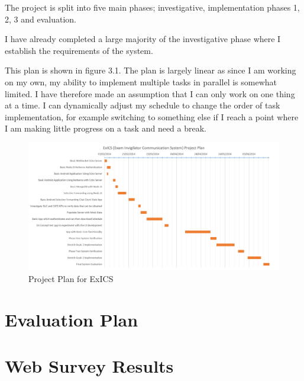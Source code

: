 \documentclass[a4paper, 12pt, notitlepage]{report}
\begin{document}
The project is split into five main phases; investigative, implementation phases 1, 2, 3 and evaluation.

I have already completed a large majority of the investigative phase where I establish the requirements of the system.

This plan is shown in figure 3.1.  The plan is largely linear as since I am working on my own, my ability to implement multiple tasks in parallel is somewhat limited.  I have therefore made an assumption that I can only work on one thing at a time.  I can dynamically adjust my schedule to change the order of task implementation, for example switching to something else if I reach a point where I am making little progress on a task and need a break.

\begin{figure}[h]
\begin{center}
\begin{minipage}{1.4\textwidth}

\hspace{-1.1in}
\centerline{\includegraphics[width=\textwidth]{"Project Plan/PP"}}

\end{minipage}
\end{center}
\caption{Project Plan for ExICS}
\end{figure}

\chapter{Evaluation Plan}
%

\appendix
\chapter{Web Survey Results}





\end{document}
